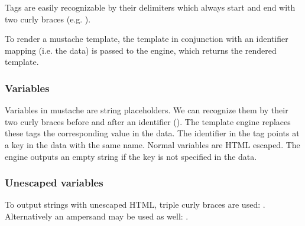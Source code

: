 Tags are easily recognizable by their delimiters which always start and end with
two curly braces (e.g. ).

To render a mustache template, the template in conjunction with an
identifier mapping (i.e. the data) is passed to the engine, which returns the
rendered template.

\subsubsection{Variables}
Variables in mustache are string placeholders. We can recognize them by their
two curly braces before and after an identifier ().
The template engine replaces these tags the corresponding value in the data.
The identifier in the tag points at a key in the data with the same name.
Normal variables are HTML escaped. The engine outputs an empty string if the
key is not specified in the data.

\subsubsection{Unescaped variables}
To output strings with unescaped HTML, triple curly braces are used:
. Alternatively an ampersand may be used as well:
.

